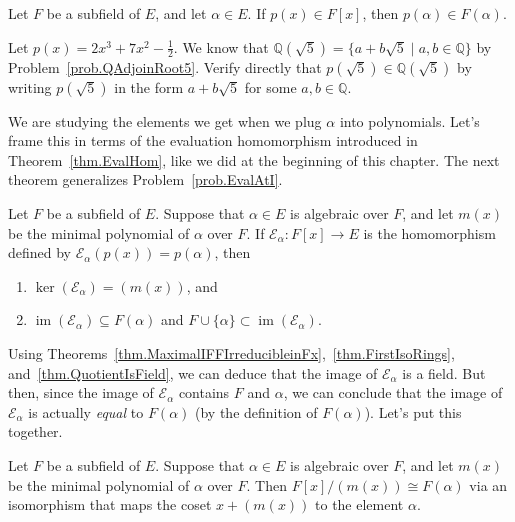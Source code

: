 \begin{theorem}
Let $F$ be a subfield of $E$, and let $\alpha\in E$. If $p(x)\in F[x]$, then $p(\alpha) \in F(\alpha)$.
\end{theorem}

\begin{problem}
Let $p(x) = 2x^3+7x^2-\frac{1}{2}$. We know that $\mathbb{Q}(\sqrt{5}) = \{a+b\sqrt{5}\mid a,b\in \mathbb{Q}\}$ by  Problem~\ref{prob.QAdjoinRoot5}. Verify directly that $p(\sqrt{5}) \in \mathbb{Q}(\sqrt{5})$ by writing $p(\sqrt{5})$ in the form $a+b\sqrt{5}$ for some $a,b\in \mathbb{Q}$.
\end{problem}

We are studying the elements we get when we plug $\alpha$ into polynomials. Let's frame this in terms of the evaluation homomorphism introduced in Theorem~\ref{thm.EvalHom}, like we did at the beginning of this chapter. The next theorem generalizes Problem~\ref{prob.EvalAtI}.

\begin{theorem}
Let $F$ be a subfield of $E$. Suppose that $\alpha\in E$ is algebraic over $F$, and let $m(x)$ be the minimal polynomial of $\alpha$ over $F$. If $\mathcal{E}_\alpha:F[x] \rightarrow E$ is the homomorphism defined by $\mathcal{E}_\alpha(p(x)) = p(\alpha)$, then 
\begin{enumerate}
\item $\ker\left(\mathcal{E}_\alpha\right)=(m(x))$, and
\item $\operatorname{im}\left(\mathcal{E}_\alpha\right)\subseteq F(\alpha)$ and $F\cup\{\alpha\}\subset \operatorname{im}\left(\mathcal{E}_\alpha\right)$.
\end{enumerate}
\end{theorem}

Using Theorems~\ref{thm.MaximalIFFIrreducibleinFx},~\ref{thm.FirstIsoRings}, and~\ref{thm.QuotientIsField}, we can deduce that the image of $\mathcal{E}_\alpha$ is a field. But then, since the image of $\mathcal{E}_\alpha$ contains $F$ and $\alpha$, we can conclude that the image of $\mathcal{E}_\alpha$ is actually \emph{equal} to $F(\alpha)$ (by the definition of $F(\alpha)$). Let's put this together.

\begin{theorem}
Let $F$ be a subfield of $E$. Suppose that $\alpha\in E$ is algebraic over $F$, and let $m(x)$ be the minimal polynomial of $\alpha$ over $F$. Then 
$F[x]/(m(x)) \cong F(\alpha)$ via an isomorphism that maps the coset $x+ (m(x))$ to the element $\alpha$.
\end{theorem}


